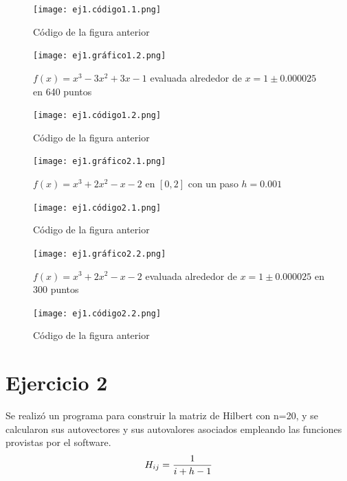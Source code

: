 \documentclass{article}
\begin{document}
\begin{figure}[H]
    \centering
    \texttt{[image: ej1.código1.1.png]}
    \caption{Código de la figura anterior}
    \label{fig:enter-label}
\end{figure}

\begin{figure}[H]
    \centering
    \texttt{[image: ej1.gráfico1.2.png]}
    \caption{$f(x)=x^3-3x^2+3x-1$ evaluada alrededor de $x=1\pm0.000025$ en 640 puntos}
    \label{fig:enter-label}
\end{figure}

\begin{figure}[H]
    \centering
    \texttt{[image: ej1.código1.2.png]}
    \caption{Código de la figura anterior}
    \label{fig:enter-label}
\end{figure}

\begin{figure}[H]
    \centering
    \texttt{[image: ej1.gráfico2.1.png]}
    \caption{$f(x)=x^3+2x^2-x-2$ en $[0, 2]$ con un paso $h=0.001$}
    \label{fig:enter-label}
\end{figure}

\begin{figure}[H]
    \centering
    \texttt{[image: ej1.código2.1.png]}
    \caption{Código de la figura anterior}
    \label{fig:enter-label}
\end{figure}

\begin{figure}[H]
    \centering
    \texttt{[image: ej1.gráfico2.2.png]}
    \caption{$f(x)=x^3+2x^2-x-2$ evaluada alrededor de $x=1\pm0.000025$ en 300 puntos}
    \label{fig:enter-label}
\end{figure}

\begin{figure}[H]
    \centering
    \texttt{[image: ej1.código2.2.png]}
    \caption{Código de la figura anterior}
    \label{fig:enter-label}
\end{figure}

\section{Ejercicio 2}
Se realizó un programa para construir la matriz de Hilbert con n=20, y se calcularon sus autovectores y sus autovalores asociados empleando las funciones provistas por el software.\\

\begin{equation}
    \centering
    H_{ij} = \dfrac{1}{i+h-1}
\end{equation}\\
\end{document}
